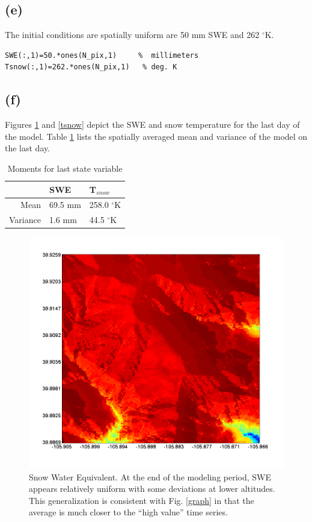 \documentclass[fleqn, letterpaper]{tufte-handout}
\begin{document}
\subsection{(e)}
The initial conditions are spatially uniform are 50 mm SWE and 262 $^\circ$K.
\begin{verbatim}
SWE(:,1)=50.*ones(N_pix,1)     %  millimeters
Tsnow(:,1)=262.*ones(N_pix,1)   % deg. K
\end{verbatim}

\subsection{(f)}
Figures \ref{swe} and \ref{tsnow} depict the SWE and snow temperature for the last day of the model. Table \ref{stats} lists the spatially averaged mean and variance of the model on the last day.
\begin{table}
	\begin{tabular}{rll}
		& SWE & T$_{snow}$ \\
		\midrule
		Mean & 69.5 mm & 258.0  $^\circ$K\\
	Variance & 1.6 mm & 44.5 $^\circ$K
	\end{tabular}
	\caption{Moments for last state variable}
	\label{stats}
\end{table}
\begin{figure}
	\includegraphics[width=\textwidth]{swe}
        \caption{Snow Water Equivalent. At the end of the modeling period, SWE appears relatively uniform with some deviations at lower altitudes. This generalization is consistent with Fig. \ref{graph} in that the average is much closer to the ``high value'' time series.}
	\label{swe}
\end{figure}
\end{document}
